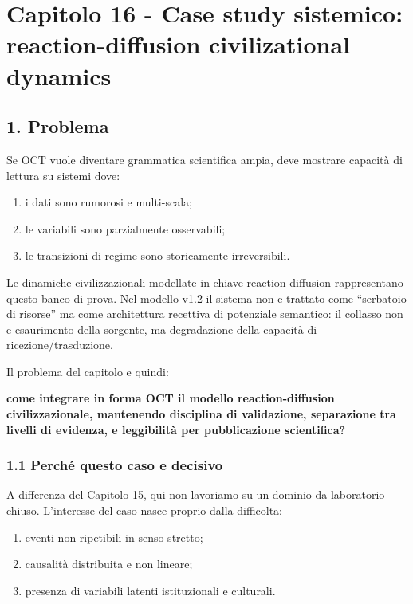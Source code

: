 \chapter{Capitolo 16 - Case study sistemico: reaction-diffusion civilizational dynamics}

\section{1. Problema}

Se OCT vuole diventare grammatica scientifica ampia, deve mostrare capacità di lettura su sistemi dove:

\begin{enumerate}
\def\labelenumi{\arabic{enumi}.}
\tightlist
\item
  i dati sono rumorosi e multi-scala;
\item
  le variabili sono parzialmente osservabili;
\item
  le transizioni di regime sono storicamente irreversibili.
\end{enumerate}

Le dinamiche civilizzazionali modellate in chiave reaction-diffusion rappresentano questo banco di prova. Nel modello v1.2 il sistema non e trattato come ``serbatoio di risorse'' ma come architettura recettiva di potenziale semantico: il collasso non e esaurimento della sorgente, ma degradazione della capacità di ricezione/trasduzione.

Il problema del capitolo e quindi:

\textbf{come integrare in forma OCT il modello reaction-diffusion civilizzazionale, mantenendo disciplina di validazione, separazione tra livelli di evidenza, e leggibilità per pubblicazione scientifica?}

\subsection{1.1 Perché questo caso e decisivo}

A differenza del Capitolo 15, qui non lavoriamo su un dominio da laboratorio chiuso. L'interesse del caso nasce proprio dalla difficolta:

\begin{enumerate}
\def\labelenumi{\arabic{enumi}.}
\tightlist
\item
  eventi non ripetibili in senso stretto;
\item
  causalità distribuita e non lineare;
\item
  presenza di variabili latenti istituzionali e culturali.
\end{enumerate}

